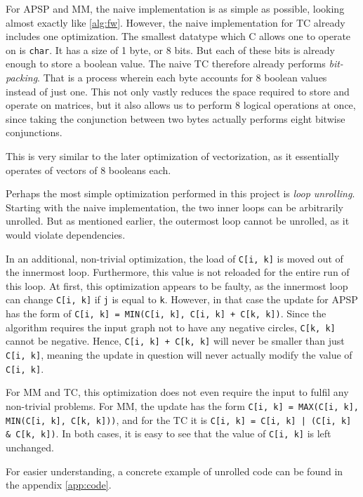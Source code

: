For APSP and MM, the naive implementation is as simple as possible, looking almost exactly like \ref{alg:fw}.
However, the naive implementation for TC already includes one optimization. The smallest datatype which C allows one to operate on is \texttt{char}. It has a size of 1 byte, or 8 bits.
But each of these bits is already enough to store a boolean value. The naive TC therefore already performs \emph{bit-packing}. That is a process wherein each byte accounts for 8 boolean values instead of just one.
This not only vastly reduces the space required to store and operate on matrices, but it also allows us to perform 8 logical operations at once, since taking the conjunction between two bytes actually performs eight bitwise conjunctions.

This is very similar to the later optimization of vectorization, as it essentially operates of vectors of 8 booleans each.

Perhaps the most simple optimization performed in this project is \emph{loop unrolling}. Starting with the naive implementation, the two inner loops can be arbitrarily unrolled. But as mentioned earlier, the outermost loop cannot be unrolled, as it would violate dependencies.

In an additional, non-trivial optimization, the load of \texttt{C[i, k]} is moved out of the innermost loop. Furthermore, this value is not reloaded for the entire run of this loop.
At first, this optimization appears to be faulty, as the innermost loop can change \texttt{C[i, k]} if \texttt{j} is equal to \texttt{k}. However, in that case the update for APSP has the form of \texttt{C[i, k] = MIN(C[i, k], C[i, k] + C[k, k])}.
Since the algorithm requires the input graph not to have any negative circles, \texttt{C[k, k]} cannot be negative. Hence, \texttt{C[i, k] + C[k, k]} will never be smaller than just \texttt{C[i, k]}, meaning the update in question will never actually modify the value of \texttt{C[i, k]}.

For MM and TC, this optimization does not even require the input to fulfil any non-trivial problems. For MM, the update has the form \texttt{C[i, k] = MAX(C[i, k], MIN(C[i, k], C[k, k]))}, and for the TC it is \texttt{C[i, k] = C[i, k] | (C[i, k] \& C[k, k])}. In both cases, it is easy to see that the value of \texttt{C[i, k]} is left unchanged.

For easier understanding, a concrete example of unrolled code can be found in the appendix \ref{app:code}.

